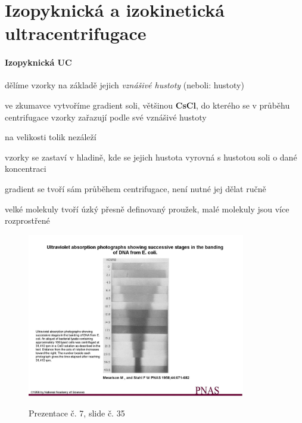 \documentclass[DIV=8]{scrreprt}
\begin{document}
\section{Izopyknická a izokinetická ultracentrifugace} \label{Izopyknická a izokinetická ultracentrifugace} \FloatBarrier


\paragraph{Izopyknická UC}
\begin{myItemize}[nosep]
    \item dělíme vzorky na základě jejich \emph{vznášivé hustoty} (neboli: hustoty)
    \item ve zkumavce vytvoříme gradient soli, většinou \textbf{CsCl}, do kterého se v průběhu centrifugace vzorky zařazují podle své vznášivé hustoty
\begin{myItemize}[nosep]
    \item na velikosti tolik nezáleží
    \item vzorky se zastaví v hladině, kde se jejich hustota vyrovná s hustotou soli o dané koncentraci
    \item gradient se tvoří sám průběhem centrifugace, není nutné jej dělat ručně
\end{myItemize}

    \item velké molekuly tvoří úzký přesně definovaný proužek, malé molekuly jsou více rozprostřené
\end{myItemize}



\begin{figure}
    \caption{Prezentace č. 7, slide č. 35}
    \includegraphics[width=0.85\textwidth]{slides-7/slide-35.jpg}
    \centering
    \label{slides-7-slide-35}
\end{figure}
\end{document}
